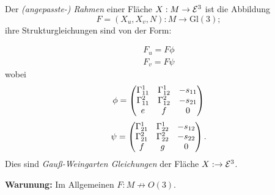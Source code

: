 \begin{lemma, definition}
	
	Der \emph{(angepasste-) Rahmen} einer Fläche $ X: M \rightarrow \mathcal E^3 $ ist die Abbildung
		\[ F = (X_u,X_v,N): M \rightarrow \mathrm{Gl}(3); \]
	ihre Strukturgleichungen sind von der Form:
		
		\begin{equation}
			\begin{split}
				F_u = F \phi \\ 
				F_v = F \psi
			\end{split}
		\end{equation}
	wobei 
		\[ \phi = \begin{pmatrix} \Gamma_{11}^1 & \Gamma_{12}^1 & -s_{11} \\ \Gamma_{11}^2 & \Gamma_{12}^2 & -s_{21} \\ e & f & 0 \end{pmatrix} \]
		\[ \psi = \begin{pmatrix} \Gamma_{21}^1 &\Gamma_{22}^1 & -s_{12} \\ \Gamma_{21}^2 &\Gamma_{22}^2 & -s_{22} \\ f & g & 0  \end{pmatrix}. \]
	Dies sind \emph{Gauß-Weingarten Gleichungen} der Fläche $ X : \rightarrow \mathcal E^3 $.
\end{lemma, definition}

\textbf{Warunung:} Im Allgemeinen $ F: M \not \rightarrow O(3). $

